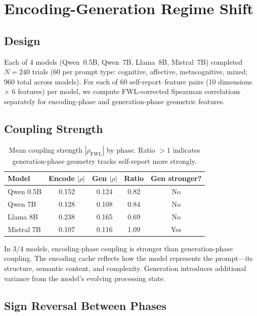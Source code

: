 \documentclass[11pt,a4paper]{article}
\begin{document}
\section{Encoding-Generation Regime Shift}

\subsection{Design}

Each of 4 models (Qwen~0.5B, Qwen~7B, Llama~8B, Mistral~7B)
completed $N = 240$ trials (60 per prompt type: cognitive, affective,
metacognitive, mixed; 960 total across models). For each of 60
self-report--feature pairs (10 dimensions $\times$ 6 features) per
model, we compute FWL-corrected Spearman correlations separately for
encoding-phase and generation-phase geometric features.

\subsection{Coupling Strength}

\begin{table}[H]
\centering
\caption{Mean coupling strength $|\rho_{\text{FWL}}|$ by phase. Ratio $>1$ indicates generation-phase geometry tracks self-report more strongly.}
\label{tab:coupling_strength}
\begin{tabular}{lcccc}
\toprule
\textbf{Model} & \textbf{Encode $|\rho|$} & \textbf{Gen $|\rho|$} & \textbf{Ratio} & \textbf{Gen stronger?} \\
\midrule
Qwen 0.5B  & 0.152 & 0.124 & 0.82 & No  \\
Qwen 7B    & 0.128 & 0.108 & 0.84 & No  \\
Llama 8B   & 0.238 & 0.165 & 0.69 & No  \\
Mistral 7B & 0.107 & 0.116 & 1.09 & Yes \\
\bottomrule
\end{tabular}
\end{table}

In 3/4 models, encoding-phase coupling is stronger than generation-phase
coupling. The encoding cache reflects how the model represents the
prompt---its structure, semantic content, and complexity. Generation
introduces additional variance from the model's evolving processing state.

\subsection{Sign Reversal Between Phases}
\end{document}
